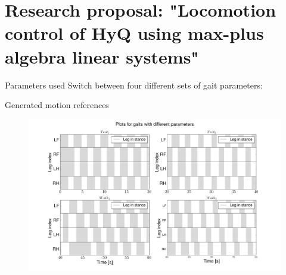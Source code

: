 \documentclass{beamer}
\begin{document}
\section{Research proposal: "Locomotion control of HyQ using max-plus algebra linear systems"}


\begin{frame}{Parameters used}
Switch between four different sets of gait parameters:
\begin{table}[b]
\centering
\label{Table:GaitParameters}
\end{table}
\end{frame}

\begin{frame}{Generated motion references}
\begin{figure}[H]\centering
	\includegraphics[width=1\textwidth]{SyncPlot.png}
\end{figure}
\end{frame}
\end{document}
